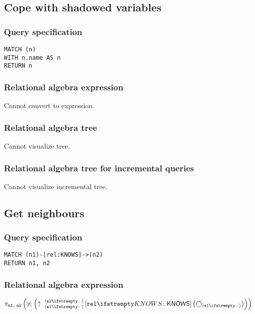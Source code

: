 \subsection{Cope with shadowed variables}

\subsubsection*{Query specification}

\begin{lstlisting}
MATCH (n)
WITH n.name AS n
RETURN n
\end{lstlisting}

\subsubsection*{Relational algebra expression}

Cannot convert to expression.

\subsubsection*{Relational algebra tree}

Cannot visualize tree.

\subsubsection*{Relational algebra tree for incremental queries}

Cannot visualize incremental tree.

\subsection{Get neighbours}

\subsubsection*{Query specification}

\begin{lstlisting}
MATCH (n1)-[rel:KNOWS]->(n2)
RETURN n1, n2
\end{lstlisting}

\subsubsection*{Relational algebra expression}

$\projection{\var{n1},~\var{n2}} \left(\alldifferent{} \left(\expandout{n1}{n2}{}{rel}{KNOWS} \left(\getvertices{n1}{}\right)\right)\right)$

